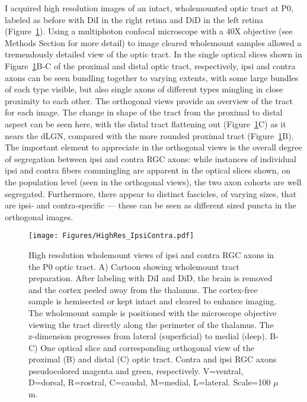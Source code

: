 I acquired high resolution images of an intact, wholemounted optic tract at P0, labeled as before with DiI in the right retina and DiD in the left retina (Figure~\ref{Figures/HighResIpsiContra}).
Using a multiphoton confocal microscope with a 40X objective (see Methods Section for more detail) to image cleared wholemount samples allowed a tremendously detailed view of the optic tract.
In the single optical slices shown in Figure~\ref{Figures/HighResIpsiContra}B-C of the proximal and distal optic tract, respectively, ipsi and contra axons can be seen bundling together to varying extents, with some large bundles of each type visible, but also single axons of different types mingling in close proximity to each other.
The orthogonal views provide an overview of the tract for each image.
The change in shape of the tract from the proximal to distal aspect can be seen here, with the distal tract flattening out (Figure~\ref{Figures/HighResIpsiContra}C) as it nears the dLGN, compared with the more rounded proximal tract (Figure~\ref{Figures/HighResIpsiContra}B).
The important element to appreciate in the orthogonal views is the overall degree of segregation between ipsi and contra RGC axons: while instances of individual ipsi and contra fibers commingling are apparent in the optical slices shown, on the population level (seen in the orthogonal views), the two axon cohorts are well segregated.
Furthermore, there appear to distinct fascicles, of varying sizes, that are ipsi- and contra-specific --- these can be seen as different sized puncta in the orthogonal images.
\begin{figure}[hbtp]
    \begin{center}
        \texttt{[image: Figures/HighRes\_IpsiContra.pdf]}
        \caption[High resolution wholemount views of ipsi and contra RGC axons in the P0 optic tract.]
        {High resolution wholemount views of ipsi and contra RGC axons in the P0 optic tract.
        A) Cartoon showing wholemount tract preparation.
        After labeling with DiI and DiD, the brain is removed and the cortex peeled away from the thalamus.
        The cortex-free sample is hemisected or kept intact and cleared to enhance imaging.
        The wholemount sample is positioned with the microscope objective viewing the tract directly along the perimeter of the thalamus.
        The z-dimension progresses from lateral (superficial) to medial (deep).
        B-C) One optical slice and corresponding orthogonal view of the proximal (B) and distal (C) optic tract.
        Contra and ipsi RGC axons pseudocolored magenta and green, respectively.
        V=ventral, D=dorsal, R=rostral, C=caudal, M=medial, L=lateral.
        Scale=100 $\mu$m.
        }
        \label{Figures/HighResIpsiContra}
    \end{center}
\end{figure}

